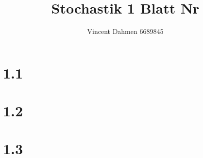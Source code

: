 \documentclass[12pt,a4paper]{article}
\title{Stochastik 1 Blatt Nr \Nr}
\author{Vincent Dahmen 6689845}
\gdef\Nr{1}
\begin{document}
\maketitle{}


\section*{\Nr.1}

\newpage
\section*{\Nr.2}


\section*{\Nr.3}

\end{document}
